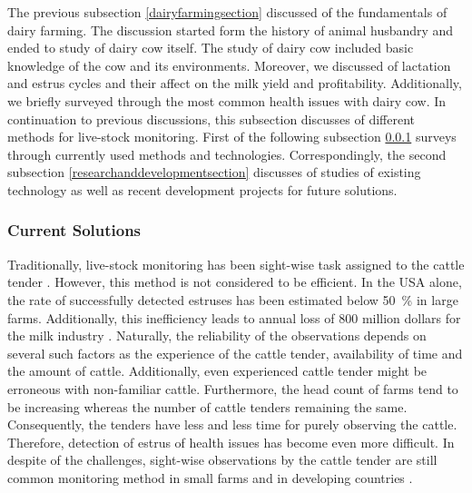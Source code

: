 \documentclass[english,12pt,a4paper,pdftex,elec,utf8]{aaltothesis}
\begin{document}
The previous subsection \ref{dairyfarmingsection} discussed of the fundamentals of dairy farming. The discussion started form the history of animal husbandry and ended to study of dairy cow itself. The study of dairy cow included basic knowledge of the cow and its environments. Moreover, we discussed of lactation and estrus cycles and their affect on the milk yield and profitability. Additionally, we briefly surveyed through the most common health issues with dairy cow. In continuation to previous discussions, this subsection discusses of different methods for live-stock monitoring. First of the following subsection \ref{currentsolutionssection} surveys through currently used methods and technologies. Correspondingly, the second subsection \ref{researchanddevelopmentsection} discusses of studies of existing technology as well as recent development projects for future solutions.  


\subsubsection{Current Solutions} \label{currentsolutionssection}

Traditionally, live-stock monitoring has been sight-wise task assigned to the cattle tender \cite{lehmahavaintoja}. However, this method is not considered to be efficient. In the USA alone, the rate of successfully detected estruses has been estimated below \SI{50}{\percent} in large farms. Additionally, this inefficiency leads to annual loss of 800 million dollars for the milk industry \cite{BRUNASSI2010}. Naturally, the reliability of the observations depends on several such factors as the experience of the cattle tender, availability of time and the amount of cattle. Additionally, even experienced cattle tender might be erroneous with non-familiar cattle. Furthermore, the head count of farms tend to be increasing whereas the number of cattle tenders remaining the same. Consequently, the tenders have less and less time for purely observing the cattle. Therefore, detection of estrus of health issues has become even more difficult. In despite of the challenges, sight-wise observations by the cattle tender are still common monitoring method in small farms and in developing countries \cite{BRUNASSI2010}. 
\end{document}
